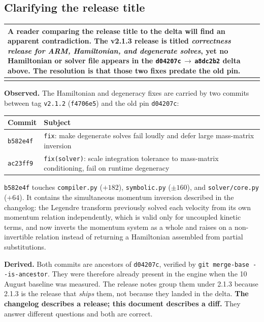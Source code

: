 \documentclass[11pt,a4paper]{article}
\makeatletter
\newenvironment{callout}
  {\par\medskip\noindent\begin{tabular}{@{}p{0.94\textwidth}@{}}
   \arrayrulecolor{warnrule}\hline\rule{0pt}{2.6ex}}
  {\\[0.8ex]\hline\arrayrulecolor{black}\end{tabular}\par\medskip}
\newcommand{\gitsha}[1]{\texttt{#1}}
\makeatother
\begin{document}
\subsection{Clarifying the release title}\label{sec:titletrap}

\begin{callout}
\textbf{A reader comparing the release title to the delta will find an apparent
contradiction.} The v2.1.3 release is titled \emph{correctness release for
ARM, Hamiltonian, and degenerate solves}, yet no Hamiltonian or solver file
appears in the \gitsha{d04207c}\,$\rightarrow$\,\gitsha{a8dc2b2} delta above.
The resolution is that those two fixes predate the old pin.
\end{callout}

\noindent\textbf{Observed.} The Hamiltonian and degeneracy fixes are carried by
two commits between tag \texttt{v2.1.2} (\gitsha{f4706e5}) and the old pin
\gitsha{d04207c}:

\begin{center}
\begin{tabular}{@{}lL{0.55\textwidth}@{}}
\toprule
\textbf{Commit} & \textbf{Subject} \\
\midrule
\gitsha{b582e4f} & \texttt{fix}: make degenerate solves fail loudly and defer large mass-matrix inversion \\
\gitsha{ac23ff9} & \texttt{fix(solver)}: scale integration tolerance to mass-matrix conditioning, fail on runtime degeneracy \\
\bottomrule
\end{tabular}
\end{center}

\gitsha{b582e4f} touches \texttt{compiler.py} ($+182$),
\texttt{symbolic.py} ($\pm160$), and \texttt{solver/core.py} ($+64$). It
contains the simultaneous momentum inversion described in the changelog: the
Legendre transform previously solved each velocity from its own momentum
relation independently, which is valid only for uncoupled kinetic terms, and
now inverts the momentum system as a whole and raises on a non-invertible
relation instead of returning a Hamiltonian assembled from partial
substitutions.

\noindent\textbf{Derived.} Both commits are ancestors of \gitsha{d04207c},
verified by \texttt{git merge-base -{}-is-ancestor}. They were therefore
already present in the engine when the 10 August baseline was measured. The
release notes group them under 2.1.3 because 2.1.3 is the release that
\emph{ships} them, not because they landed in the delta. \textbf{The changelog
describes a release; this document describes a diff.} They answer different
questions and both are correct.
\end{document}
